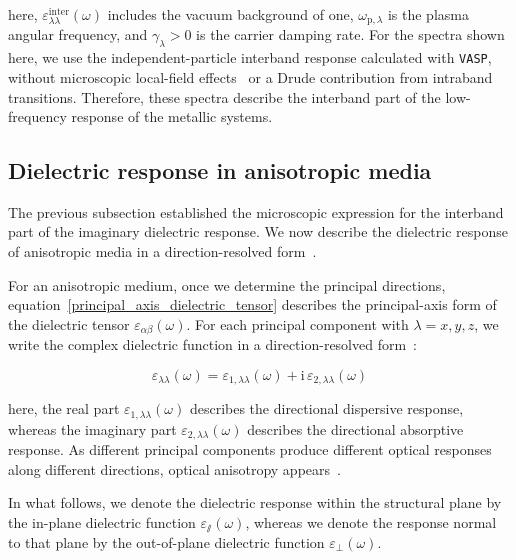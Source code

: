 here, $\varepsilon_{\lambda\lambda}^{\mathrm{inter}}(\omega)$ includes the vacuum background of one,
$\omega_{\mathrm{p},\lambda}$ is the plasma angular frequency,
and $\gamma_{\lambda}>0$ is the carrier damping rate.
For the spectra shown here, we use the independent-particle interband response calculated with \texttt{VASP},
without microscopic local-field effects~\cite{adler1962quantum,wiser1963dielectric} or a Drude contribution from intraband transitions.
Therefore, these spectra describe the interband part of the low-frequency response of the metallic systems.

\FloatBarrier
\subsection{Dielectric response in anisotropic media}

The previous subsection established the microscopic expression for the interband part of the imaginary dielectric response.
We now describe the dielectric response of anisotropic media in a direction-resolved form~\cite{slavich2024exploring}.

For an anisotropic medium, once we determine the principal directions,
equation~\eqref{principal_axis_dielectric_tensor} describes the principal-axis form of the dielectric tensor $\varepsilon_{\alpha\beta}(\omega)$.
For each principal component with $\lambda=x,y,z$, 
we write the complex dielectric function in a direction-resolved form~\cite{nye1985physical}:

\begin{equation}
    \varepsilon_{\lambda\lambda}(\omega) =
    \varepsilon_{1,\lambda\lambda}(\omega)
    + \mathrm{i}\,\varepsilon_{2,\lambda\lambda}(\omega)
\label{direction_resolved_complex_dielectric_function}
\end{equation}

here, the real part $\varepsilon_{1,\lambda\lambda}(\omega)$ describes the directional dispersive response,
whereas the imaginary part $\varepsilon_{2,\lambda\lambda}(\omega)$ describes the directional absorptive response.
As different principal components produce different optical responses along different directions, 
optical anisotropy appears~\cite{nye1985physical}.

In what follows,
we denote the dielectric response within the structural plane by the in-plane dielectric function $\varepsilon_{\varparallel}(\omega)$,
whereas we denote the response normal to that plane by
the out-of-plane dielectric function $\varepsilon_{\perp}(\omega)$.

